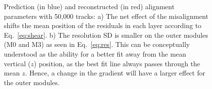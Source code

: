 \documentclass[a4paper,11pt]{article}
\begin{document}
\begin{figure}[!ht]
	\centering
	\vspace{-0.15cm}
	\caption{Prediction (in blue) and reconstructed (in red) alignment parameters with 50,000 tracks: a) The net effect of the misalignment shifts the mean position of the residuals in each layer according to Eq.~\ref{eq:shear}. b) The resolution SD is smaller on the outer modules (M0 and M3) as seen in Eq.~\ref{eq:res}. This can be conceptually understood as the ability for a better fit away from the mean vertical ($z$) position, as the best fit line always passes through the mean $z$. Hence, a change in the gradient will have a larger effect for the outer modules. }
	\label{fig:res}
\end{figure}
\end{document}

